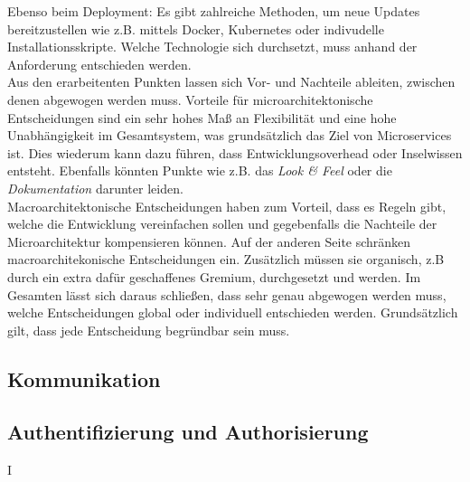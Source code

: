 Ebenso beim Deployment: Es gibt zahlreiche Methoden, um neue Updates bereitzustellen wie z.B. mittels Docker, Kubernetes oder indivudelle Installationsskripte.\cite{wolff2018mic_praxis} Welche Technologie sich durchsetzt, muss anhand der Anforderung entschieden werden. \\

Aus den erarbeitenten Punkten lassen sich Vor- und Nachteile ableiten, zwischen denen abgewogen werden muss. Vorteile für microarchitektonische Entscheidungen sind ein sehr hohes Maß an Flexibilität und eine hohe Unabhängigkeit im Gesamtsystem, was grundsätzlich das Ziel von Microservices ist. Dies wiederum kann dazu führen, dass Entwicklungsoverhead oder Inselwissen entsteht. Ebenfalls könnten Punkte wie z.B. das \textit{Look \& Feel} oder die \textit{Dokumentation} darunter leiden.  \\

Macroarchitektonische Entscheidungen haben zum Vorteil, dass es Regeln gibt, welche die Entwicklung vereinfachen sollen und gegebenfalls die Nachteile der Microarchitektur kompensieren können. Auf der anderen Seite schränken macroarchitekonische Entscheidungen ein. Zusätzlich müssen sie organisch, z.B durch ein extra dafür geschaffenes Gremium, durchgesetzt und werden.\cite{wolff2018mic_praxis} Im Gesamten lässt sich daraus schließen, dass sehr genau abgewogen werden muss, welche Entscheidungen global oder individuell entschieden werden. Grundsätzlich gilt, dass jede Entscheidung begründbar sein muss.    



\subsection{Kommunikation}

\subsection{Authentifizierung und Authorisierung}



I%

